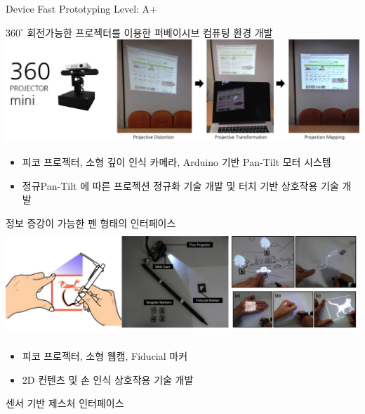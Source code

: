 \begin{cventries}
  \cventry
    {Device Fast Prototyping} %
    {} %
    {} %
    {Level: A+} %
    {
      \begin{cvitems} %
        \item {$360^{\circ}$ 회전가능한 프로젝터를 이용한 퍼베이시브 컴퓨팅 환경 개발 \\
          \includegraphics[width=\linewidth]{cv/resources/pervasiveAR.png}
          \begin{itemize}
              \item {피코 프로젝터, 소형 깊이 인식 카메라, Arduino 기반 Pan-Tilt 모터 시스템}
              \item {정규Pan-Tilt 에 따른 프로젝션 정규화 기술 개발 및 터치 기반 상호작용 기술 개발}
          \end{itemize}
        }
        \item {정보 증강이 가능한 펜 형태의 인터페이스 \\
          \includegraphics[width=\linewidth, height=40mm]{cv/resources/augpen.png}
          \begin{itemize}
            \item {피코 프로젝터, 소형 웹캠, Fiducial 마커}
            \item {2D 컨텐츠 및 손 인식 상호작용 기술 개발}
          \end{itemize}
        }
        \item {센서 기반 제스처 인터페이스 \\
}
\end{cvitems}}
\end{cventries}

